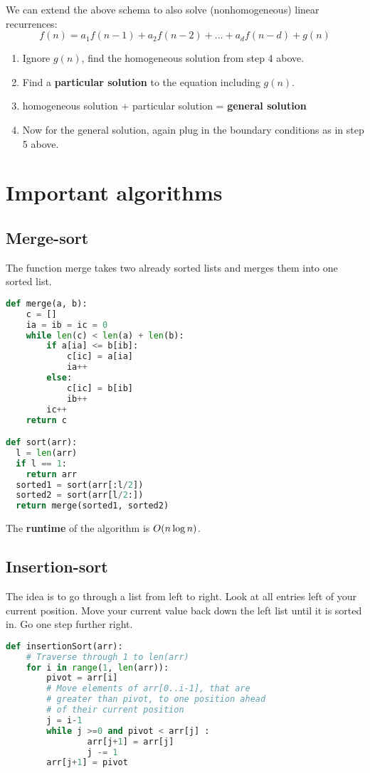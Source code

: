 We can extend the above schema to also solve (nonhomogeneous) linear recurrences: 
$$ f(n) = a_1 f(n-1) + a_2 f(n-2) + ... + a_d f(n-d) + g(n)$$

\begin{enumerate}
    \item Ignore $g(n)$, find the homogeneous solution from step 4 above.
    \item Find a \textbf{particular solution} to the equation including $g(n)$.
    \item homogeneous solution + particular solution = \textbf{general solution}
    \item Now for the general solution, again plug in the boundary conditions as in step 5 above.
\end{enumerate}


\section{Important algorithms}

\subsection{Merge-sort}

The function merge takes two already sorted lists and merges them into one sorted list.

\begin{lstlisting}[language=python]
def merge(a, b):
    c = []
    ia = ib = ic = 0
    while len(c) < len(a) + len(b):
        if a[ia] <= b[ib]:
            c[ic] = a[ia]
            ia++
        else:
            c[ic] = b[ib]
            ib++
        ic++
    return c

def sort(arr):
  l = len(arr)
  if l == 1:
    return arr
  sorted1 = sort(arr[:l/2])
  sorted2 = sort(arr[l/2:])
  return merge(sorted1, sorted2)
\end{lstlisting}


The \textbf{runtime} of the algorithm is $O(n \log n)$.

\subsection{Insertion-sort}

The idea is to go through a list from left to right. Look at all entries left of your current position. Move your current value back down the left list until it is sorted in. Go one step further right.
\begin{lstlisting}[language=python]
  def insertionSort(arr):
    # Traverse through 1 to len(arr)
    for i in range(1, len(arr)):
        pivot = arr[i]
        # Move elements of arr[0..i-1], that are
        # greater than pivot, to one position ahead
        # of their current position
        j = i-1
        while j >=0 and pivot < arr[j] :
                arr[j+1] = arr[j]
                j -= 1
        arr[j+1] = pivot
\end{lstlisting}

